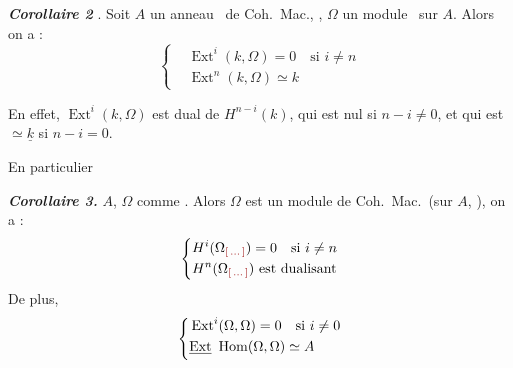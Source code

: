 \documentclass[11pt,a4paper]{article}
\begin{document}
\struck{\ill{}} \textbf{\emph{Corollaire 2}} . Soit $A$
un anneau \ de Coh.\ Mac., , $\Omega$ un module
 \ sur $A$.
Alors on a :
\[
\left\{
\begin{aligned}
  &\operatorname{Ext}^i(k, \Omega) = 0 \quad \text{si } i \neq n\\
  &\operatorname{Ext}^n(k, \Omega) \simeq k
\end{aligned}
\right.
\]

En effet, $\operatorname{Ext}^i(k, \Omega)$ est
dual de $H^{n-i}(k)$, qui est nul si
$n - i \neq 0$, et qui est $\simeq \underline{k}$ si $n - i =
0$.

En particulier

\textbf{\emph{Corollaire 3.}} $A$, $\Omega$ comme . Alors $\Omega$ est un module de
Coh.\ Mac.\ (sur $A$, ), on a :
\[
\left\{
\begin{aligned}
  &H^i(\Omega_{\ill{}}) = 0 \quad \text{si } i \neq n\\
  &H^n(\Omega_{\ill{}}) \text{ est dualisant}
\end{aligned}
\right.
\]
De plus, 
\[
\left\{
\begin{aligned}
  &\operatorname{Ext}^i(\Omega, \Omega) = 0 \quad \text{si } i \neq 0\\
  &\struck{\operatorname{Ext}}\ \operatorname{Hom}(\Omega, \Omega) \simeq A
\end{aligned}
\right.
\]
\end{document}
